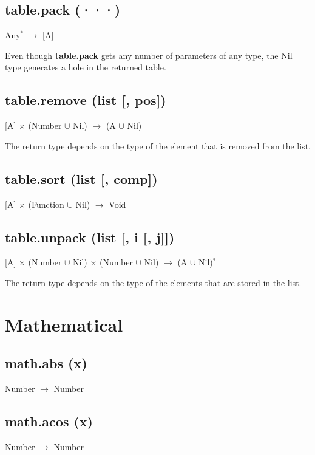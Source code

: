 \documentclass[12pt]{article}
\begin{document}
\subsection{table.pack (···)}

Any$^*$ $\rightarrow$ [A]

Even though \textbf{table.pack} gets any number of parameters of
any type, the Nil type generates a hole in the returned table.

\subsection{table.remove (list [, pos])}

[A] $\times$ (Number $\cup$ Nil) $\rightarrow$ (A $\cup$ Nil)

The return type depends on the type of the element that is removed
from the list.

\subsection{table.sort (list [, comp])}

[A] $\times$ (Function $\cup$ Nil) $\rightarrow$ Void

\subsection{table.unpack (list [, i [, j]])}

[A] $\times$
(Number $\cup$ Nil) $\times$
(Number $\cup$ Nil) $\rightarrow$
(A $\cup$ Nil)$^*$

The return type depends on the type of the elements that are stored in
the list.

\newpage

\section{Mathematical}

\subsection{math.abs (x)}

Number $\rightarrow$ Number

\subsection{math.acos (x)}

Number $\rightarrow$ Number
\end{document}
